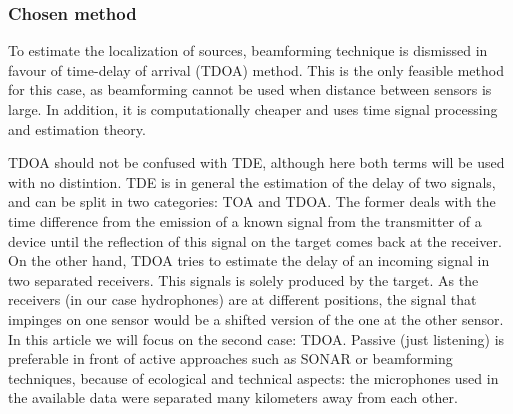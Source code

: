 \subsubsection{Chosen method}
To estimate the localization of sources, beamforming technique is dismissed in favour of time-delay of arrival (TDOA) method. This is the only feasible method for this case, as beamforming cannot be used when distance between sensors is large. In addition, it is computationally cheaper and uses time signal processing and estimation theory.

TDOA should not be confused with TDE, although here both terms will be used with no distintion. TDE is in general the estimation of the delay of two signals, and can be split in two categories: TOA and TDOA. The former deals with the time difference from the emission of a known signal from the transmitter of a device until the reflection of this signal on the target comes back at the receiver. On the other hand, TDOA tries to estimate the delay of an incoming signal in two separated receivers. This signals is solely produced by the target. As the receivers (in our case hydrophones) are at different positions, the signal that impinges on one sensor would be a shifted version of the one at the other sensor. In this article we will focus on the second case: TDOA. Passive (just listening) is preferable in front of active approaches such as SONAR or beamforming techniques, because of ecological and technical aspects: the microphones used in the available data were separated many kilometers away from each other.

